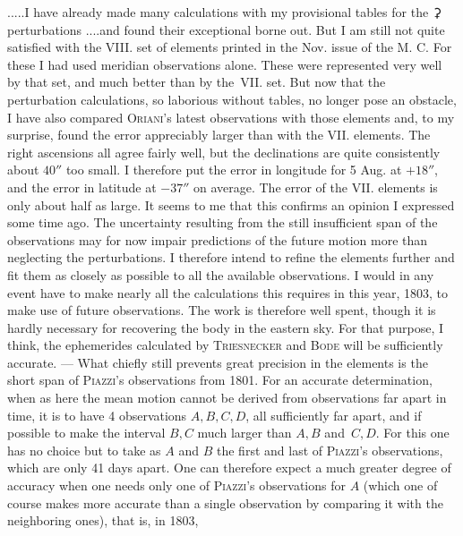 \noindent\hspace*{\parindent}.\quad.\quad.\quad.\quad.\quad I have already made many calculations with my provisional tables for the {\AstroSymbols ⚳} perturbations .\quad.\quad.\quad.\quad and found their exceptional  borne out. But I am still not quite satisfied with the VIII. set of elements printed in the Nov. issue of the M. C. For these I had used meridian observations alone. These were represented very well by that set, and much better than by the\, VII. set. But now that the perturbation calculations, so laborious without tables, no longer pose an obstacle, I have also compared \textsc{Oriani}'s latest observations with those elements and, to my surprise, found the error appreciably larger than with the VII. elements. The right ascensions all agree fairly well, but the declinations are quite consistently about \(40''\) too small. I therefore put the error in longitude for 5 Aug. at \(+18''\), and the error in latitude at \(-37''\) on average. The error of the VII. elements is only about half as large. It seems to me that this confirms an opinion I expressed some time ago. The uncertainty resulting from the still insufficient span of the observations may for now impair predictions of the future motion more than neglecting the perturbations. I therefore intend to refine the elements further and fit them as closely as possible to all the available observations. I would in any event have to make nearly all the calculations this requires in this year, 1803, to make use of future observations. The work is therefore well spent, though it is hardly necessary for recovering the body in the eastern sky. For that purpose, I think, the ephemerides calculated by \textsc{Triesnecker} and \textsc{Bode} will be sufficiently accurate. — What chiefly still prevents great precision in the elements is the short span of \textsc{Piazzi}'s observations from 1801. For an accurate determination, when as here the mean motion cannot be derived from observations far apart in time, it is  to have 4 observations \(A,B,C,D\), all sufficiently far apart, and if possible to make the interval \(B,C\) much larger than \(A,B\) and\, \(C,D\). For this one has no choice but to take as \(A\) and \(B\) the first and last of \textsc{Piazzi}'s observations, which are only 41 days apart. One can therefore expect a much greater degree of accuracy when one needs only one of \textsc{Piazzi}'s observations for \(A\) (which one of course makes more accurate than a single observation by comparing it with the neighboring ones), that is, in 1803,
